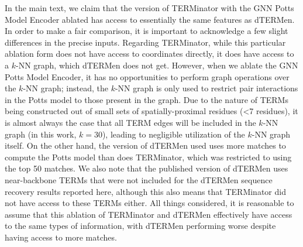 \documentclass{article}
\begin{document}
In the main text, we claim that the version of TERMinator with the GNN Potts Model Encoder ablated has access to essentially the same features as dTERMen. In order to make a fair comparison, it is important to acknowledge a few slight differences in the precise inputs. Regarding TERMinator, while this particular ablation form does not have access to coordinates directly, it does have access to a $k$-NN graph, which dTERMen does not get. However, when we ablate the GNN Potts Model Encoder, it has no opportunities to perform graph operations over the $k$-NN graph; instead, the $k$-NN graph is only used to restrict pair interactions in the Potts model to those present in the graph. Due to the nature of TERMs being constructed out of small sets of spatially-proximal residues (<7 residues), it is almost always the case that all TERM edges will be included in the $k$-NN graph (in this work, $k=30$), leading to negligible utilization of the $k$-NN graph itself. On the other hand, the version of dTERMen used uses more matches to compute the Potts model than does TERMinator, which was restricted to using the top 50 matches. We also note that the published version of dTERMen uses near-backbone TERMs that were not included for the dTERMen sequence recovery results reported here, although this also means that TERMinator did not have access to these TERMs either. All things considered, it is reasonable to assume that this ablation of TERMinator and dTERMen effectively have access to the same types of information, with dTERMen performing worse despite having access to more matches.
\newpage



\end{document}

